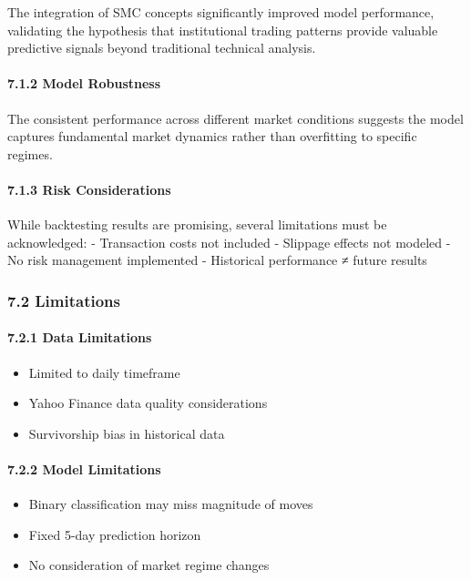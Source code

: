 The integration of SMC concepts significantly improved model
performance, validating the hypothesis that institutional trading
patterns provide valuable predictive signals beyond traditional
technical analysis.

\paragraph{7.1.2 Model Robustness}\label{model-robustness}

The consistent performance across different market conditions suggests
the model captures fundamental market dynamics rather than overfitting
to specific regimes.

\paragraph{7.1.3 Risk Considerations}\label{risk-considerations}

While backtesting results are promising, several limitations must be
acknowledged: - Transaction costs not included - Slippage effects not
modeled - No risk management implemented - Historical performance ≠
future results

\subsubsection{7.2 Limitations}\label{limitations}

\paragraph{7.2.1 Data Limitations}\label{data-limitations}

\begin{itemize}
\tightlist
\item
  Limited to daily timeframe
\item
  Yahoo Finance data quality considerations
\item
  Survivorship bias in historical data
\end{itemize}

\paragraph{7.2.2 Model Limitations}\label{model-limitations}

\begin{itemize}
\tightlist
\item
  Binary classification may miss magnitude of moves
\item
  Fixed 5-day prediction horizon
\item
  No consideration of market regime changes
\end{itemize}

